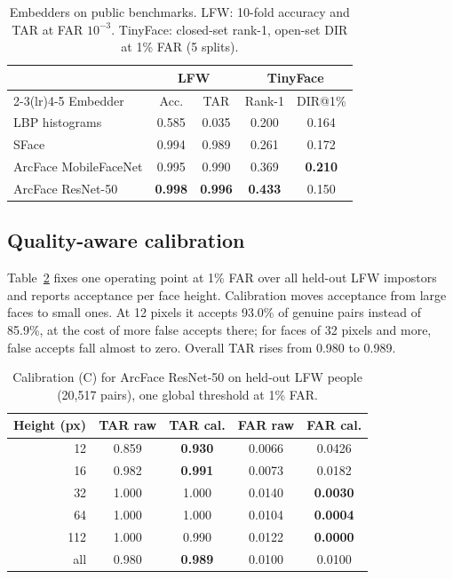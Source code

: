 \documentclass[conference,a4paper]{IEEEtran}
\begin{document}
\begin{table}[t]
\caption{Embedders on public benchmarks. LFW: 10-fold accuracy and TAR at FAR $10^{-3}$. TinyFace: closed-set rank-1, open-set DIR at 1\% FAR (5 splits).}
\label{tab:public}
\centering
\setlength{\tabcolsep}{3.5pt}
\begin{tabular}{lcccc}
\toprule
& \multicolumn{2}{c}{LFW} & \multicolumn{2}{c}{TinyFace} \\
\cmidrule(lr){2-3}\cmidrule(lr){4-5}
Embedder & Acc. & TAR & Rank-1 & DIR@1\% \\
\midrule
LBP histograms & 0.585 & 0.035 & 0.200 & 0.164 \\
SFace & 0.994 & 0.989 & 0.261 & 0.172 \\
ArcFace MobileFaceNet & 0.995 & 0.990 & 0.369 & \textbf{0.210} \\
ArcFace ResNet-50 & \textbf{0.998} & \textbf{0.996} & \textbf{0.433} & 0.150 \\
\bottomrule
\end{tabular}
\end{table}

\subsection{Quality-aware calibration}
Table~\ref{tab:calib} fixes one operating point at 1\% FAR over all held-out LFW impostors and reports acceptance per face height. Calibration moves acceptance from large faces to small ones. At 12 pixels it accepts 93.0\% of genuine pairs instead of 85.9\%, at the cost of more false accepts there; for faces of 32 pixels and more, false accepts fall almost to zero. Overall TAR rises from 0.980 to 0.989.

\begin{table}[t]
\caption{Calibration (C) for ArcFace ResNet-50 on held-out LFW people (20,517 pairs), one global threshold at 1\% FAR.}
\label{tab:calib}
\centering
\setlength{\tabcolsep}{4pt}
\begin{tabular}{rcccc}
\toprule
Height (px) & TAR raw & TAR cal. & FAR raw & FAR cal. \\
\midrule
12 & 0.859 & \textbf{0.930} & 0.0066 & 0.0426 \\
16 & 0.982 & \textbf{0.991} & 0.0073 & 0.0182 \\
32 & 1.000 & 1.000 & 0.0140 & \textbf{0.0030} \\
64 & 1.000 & 1.000 & 0.0104 & \textbf{0.0004} \\
112 & 1.000 & 0.990 & 0.0122 & \textbf{0.0000} \\
all & 0.980 & \textbf{0.989} & 0.0100 & 0.0100 \\
\bottomrule
\end{tabular}
\end{table}
\end{document}
